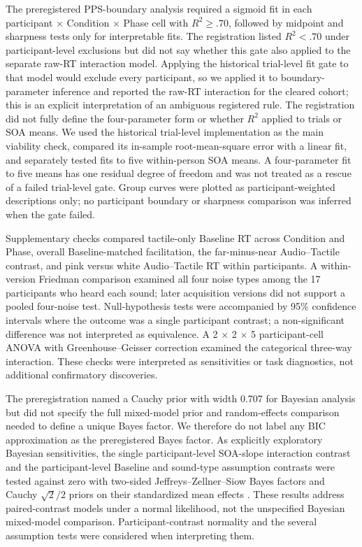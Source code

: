 The preregistered PPS-boundary analysis required a sigmoid fit in each participant $\times$ Condition $\times$ Phase cell with $R^{2}\geq .70$, followed by midpoint and sharpness tests only for interpretable fits. The registration listed $R^{2}<.70$ under participant-level exclusions but did not say whether this gate also applied to the separate raw-RT interaction model. Applying the historical trial-level fit gate to that model would exclude every participant, so we applied it to boundary-parameter inference and reported the raw-RT interaction for the cleared cohort; this is an explicit interpretation of an ambiguous registered rule. The registration did not fully define the four-parameter form or whether $R^{2}$ applied to trials or SOA means. We used the historical trial-level implementation as the main viability check, compared its in-sample root-mean-square error with a linear fit, and separately tested fits to five within-person SOA means. A four-parameter fit to five means has one residual degree of freedom and was not treated as a rescue of a failed trial-level gate. Group curves were plotted as participant-weighted descriptions only; no participant boundary or sharpness comparison was inferred when the gate failed.

Supplementary checks compared tactile-only Baseline RT across Condition and Phase, overall Baseline-matched facilitation, the far-minus-near Audio--Tactile contrast, and pink versus white Audio--Tactile RT within participants. A within-version Friedman comparison examined all four noise types among the 17 participants who heard each sound; later acquisition versions did not support a pooled four-noise test. Null-hypothesis tests were accompanied by 95\% confidence intervals where the outcome was a single participant contrast; a non-significant difference was not interpreted as equivalence. A 2 $\times$ 2 $\times$ 5 participant-cell ANOVA with Greenhouse--Geisser correction examined the categorical three-way interaction. These checks were interpreted as sensitivities or task diagnostics, not additional confirmatory discoveries.

The preregistration named a Cauchy prior with width 0.707 for Bayesian analysis but did not specify the full mixed-model prior and random-effects comparison needed to define a unique Bayes factor. We therefore do not label any BIC approximation as the preregistered Bayes factor. As explicitly exploratory Bayesian sensitivities, the single participant-level SOA-slope interaction contrast and the participant-level Baseline and sound-type assumption contrasts were tested against zero with two-sided Jeffreys--Zellner--Siow Bayes factors and Cauchy $\sqrt{2}/2$ priors on their standardized mean effects \citep{Rouder2009BayesianT}. These results address paired-contrast models under a normal likelihood, not the unspecified Bayesian mixed-model comparison. Participant-contrast normality and the several assumption tests were considered when interpreting them.

